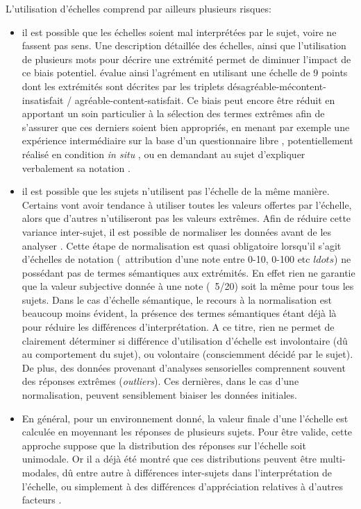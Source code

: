 L'utilisation d'échelles comprend par ailleurs plusieurs risques:

\begin{itemize}
\item il est possible que les échelles soient mal interprétées par le sujet, voire ne fassent pas sens. Une description détaillée des échelles, ainsi que l'utilisation de plusieurs mots pour décrire une extrémité permet de diminuer l'impact de ce biais potentiel. \citep{hall2013exploratory} évalue ainsi l'agrément en utilisant une échelle de 9 points dont les extrémités sont décrites par les triplets désagréable-mécontent-insatisfait / agréable-content-satisfait. Ce biais peut encore être réduit en apportant un soin particulier à la sélection des termes extrêmes afin de s'assurer que ces derniers soient bien appropriés, en menant par exemple une expérience intermédiaire sur la base d'un questionnaire libre \citep{guastavino2004perceptual}, potentiellement réalisé en condition \emph{in situ} \citep{kang2010semantic,hong2013designing}, ou en demandant au sujet d'expliquer verbalement sa notation \citep{raimbault2006qualitative}. 
\item il est possible que les sujets n'utilisent pas l'échelle de la même manière. Certains vont avoir tendance à utiliser toutes les valeurs offertes par l'échelle, alors que d'autres n'utiliseront pas les valeurs extrêmes. Afin de réduire cette variance inter-sujet, il est possible de normaliser les données avant de les analyser \citep{defreville2004aactivity,lavandier2006contribution,nielbo2013investigating,hong2013designing}. Cette étape de normalisation est quasi obligatoire lorsqu'il s'agit d'échelles de notation (\eg~attribution d'une note entre 0-10, 0-100 etc $ldots$) ne possédant pas de termes sémantiques aux extrémités. En effet rien ne garantie que la valeur subjective donnée à une note (\eg~5/20) soit la même pour tous les sujets. Dans le cas d'échelle sémantique, le recours à la normalisation est beaucoup moins évident, la présence des termes sémantiques étant déjà là pour réduire les différences d'interprétation. A ce titre, rien ne permet de clairement déterminer si différence d'utilisation d'échelle est involontaire (dû au comportement du sujet), ou volontaire (consciemment décidé par le sujet).  De plus, des données provenant d'analyses sensorielles comprennent souvent des réponses extrêmes (\emph{outliers}). Ces dernières, dans le cas d'une normalisation, peuvent sensiblement biaiser les données initiales.
\item En général, pour un environnement donné, la valeur finale d'une l'échelle est calculée en moyennant les réponses de plusieurs sujets. Pour être valide, cette approche suppose que la distribution des réponses sur l'échelle soit unimodale. Or il a déjà été montré que ces distributions peuvent être multi-modales, dû entre autre à différences inter-sujets dans l'interprétation de l'échelle, ou simplement à des différences d'appréciation relatives à d'autres facteurs \citep{raimbault2006qualitative}. 
\end{itemize}


